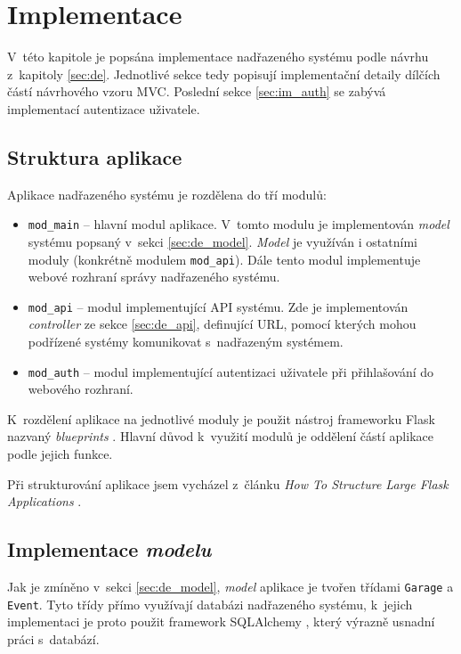 \chapter{Implementace}
\label{sec:im}

V~této kapitole je popsána implementace nadřazeného systému podle návrhu z~kapitoly \ref{sec:de}. Jednotlivé sekce tedy popisují implementační detaily dílčích částí návrhového vzoru MVC. Poslední sekce \ref{sec:im_auth} se zabývá implementací autentizace uživatele.

\section{Struktura aplikace}

Aplikace nadřazeného systému je rozdělena do tří modulů:

\begin{itemize}
    \item \texttt{mod\_main} -- hlavní modul aplikace. V~tomto modulu je implementován \textit{model} systému popsaný v~sekci \ref{sec:de_model}. \textit{Model} je využíván i ostatními moduly (konkrétně modulem \texttt{mod\_api}). Dále tento modul implementuje webové rozhraní správy nadřazeného systému.
    \item \texttt{mod\_api} -- modul implementující API systému. Zde je implementován \textit{controller} ze sekce \ref{sec:de_api}, definující URL, pomocí kterých mohou podřízené systémy komunikovat s~nadřazeným systémem.
    \item \texttt{mod\_auth} -- modul implementující autentizaci uživatele při přihlašování do webového rozhraní.
\end{itemize}

K~rozdělení aplikace na jednotlivé moduly je použit nástroj frameworku Flask nazvaný \textit{blueprints} \cite{flask_blueprints}.  Hlavní důvod k~využití modulů je oddělení částí aplikace podle jejich funkce.

Při strukturování aplikace jsem vycházel z~článku \textit{How To Structure Large Flask Applications} \cite{flask_large}.

\section{Implementace \textit{modelu}}

Jak je zmíněno v~sekci \ref{sec:de_model}, \textit{model} aplikace je tvořen třídami \texttt{Garage} a \texttt{Event}. Tyto třídy přímo využívají databázi nadřazeného systému, k~jejich implementaci je proto použit framework SQLAlchemy \cite{sqlalchemy}, který výrazně usnadní práci s~databází.

